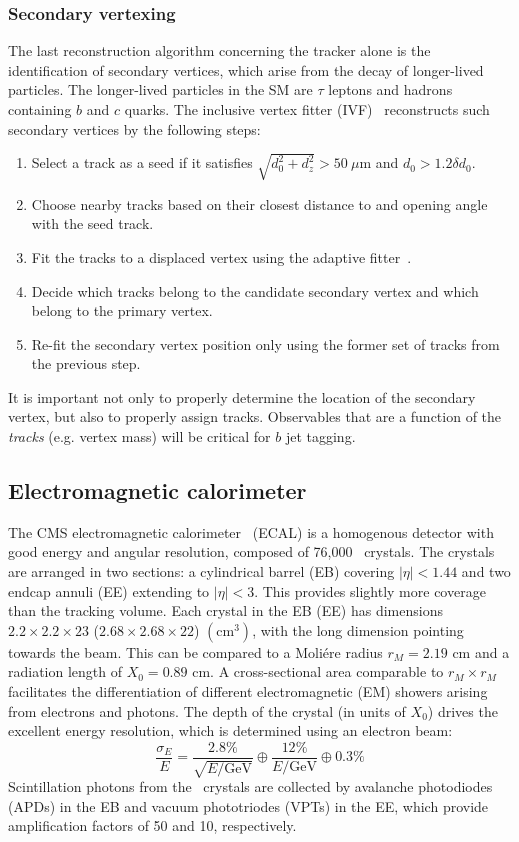 \subsubsection{Secondary vertexing}

The last reconstruction algorithm concerning the tracker alone is the identification of secondary vertices, which arise from the decay of longer-lived particles.
The longer-lived particles in the SM are $\tau$ leptons and hadrons containing $b$ and $c$ quarks.
The inclusive vertex fitter (IVF)~\cite{csvv2} reconstructs such secondary vertices by the following steps:
\begin{enumerate}
    \item Select a track as a seed if it satisfies $\sqrt{d_0^2 + d_z^2} > 50~\mu\mathrm{m}$ and $d_0 > 1.2 \delta d_0$.
    \item Choose nearby tracks based on their closest distance to and opening angle with the seed track.
    \item Fit the tracks to a displaced vertex using the adaptive fitter~\cite{adaptivefit}.
    \item Decide which tracks belong to the candidate secondary vertex and which belong to the primary vertex.
    \item Re-fit the secondary vertex position only using the former set of tracks from the previous step.
\end{enumerate}
It is important not only to properly determine the location of the secondary vertex, but also to properly assign tracks.
Observables that are a function of the \emph{tracks} (e.g. vertex mass) will be critical for $b$ jet tagging.

\subsection{Electromagnetic calorimeter}

The CMS electromagnetic calorimeter~\cite{cmsecaljinst} (ECAL) is a homogenous detector with good energy and angular resolution, composed of 76,000 \pbwo~crystals. 
The crystals are arranged in two sections: a cylindrical barrel (EB) covering $|\eta|<1.44$ and two endcap annuli (EE) extending to $|\eta|<3$.
This provides slightly more coverage than the tracking volume.
Each crystal in the EB (EE) has dimensions $2.2\times2.2\times23$ ($2.68\times2.68\times22$) $(\mathrm{cm}^3)$, with the long dimension pointing towards the beam.
This can be compared to a Moli\'ere radius $r_M=2.19$ cm and a radiation length of $X_0=0.89$ cm. 
A cross-sectional area comparable to $r_M\times r_M$ facilitates the differentiation of different electromagnetic (EM) showers arising from electrons and photons.
The depth of the crystal (in units of $X_0$) drives the excellent energy resolution, which is determined using an electron beam:
\begin{equation}
    \frac{\sigma_E}{E} = \frac{2.8\%}{\sqrt{E/\mathrm{GeV}}} \oplus \frac{12\%}{E/\mathrm{GeV}} \oplus 0.3\%
\end{equation}
Scintillation photons from the \pbwo~crystals are collected by avalanche photodiodes (APDs) in the EB and vacuum phototriodes (VPTs) in the EE, which provide amplification factors of 50 and 10, respectively. 

